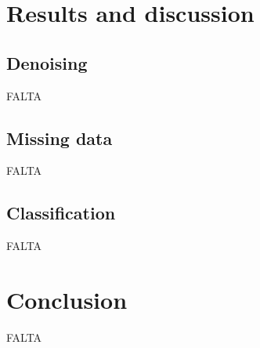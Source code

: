 \documentclass[a4paper]{IEEEtran}
\begin{document}
\section{Results and discussion}

\subsection{Denoising}

FALTA

\subsection{Missing data}

FALTA

\subsection{Classification}

FALTA

\section{Conclusion}

FALTA



\end{document}
